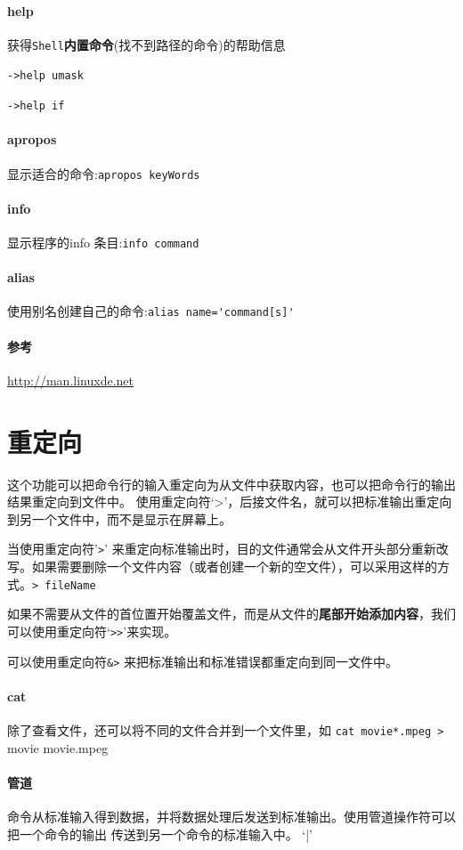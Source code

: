 \documentclass[UTF8,a4paper,12pt]{ctexbook}
\begin{document}
		\paragraph{help} 获得\verb|Shell|\textbf{内置命令}(找不到路径的命令)的帮助信息
		
			\verb|->help umask|
			
			\verb|->help if|
		
		\paragraph{apropos} 显示适合的命令:\verb|apropos keyWords|
		
		\paragraph{info} 显示程序的info 条目:\verb|info command|
		\paragraph{alias} 使用别名创建自己的命令:\verb|alias name='command[s]'|
		\paragraph{参考}\url{http://man.linuxde.net}
		
	\section{重定向}这个功能可以把命令行的输入重定向为从文件中获取内容，也可以把命令行的输出结果重定向到文件中。 使用重定向符‘>’，后接文件名，就可以把标准输出重定向到另一个文件中，而不是显示在屏幕上。
	
		当使用重定向符'\verb|>|' 来重定向标准输出时，目的文件通常会从文件开头部分重新改写。如果需要删除一个文件内容（或者创建一个新的空文件），可以采用这样的方式。\verb|> fileName|
		
		如果不需要从文件的首位置开始覆盖文件，而是从文件的\textbf{尾部开始添加内容}，我们可以使用重定向符‘\verb|>>|’来实现。
		
		可以使用重定向符\verb|&>| 来把标准输出和标准错误都重定向到同一文件中。
		
		\paragraph{cat}除了查看文件，还可以将不同的文件合并到一个文件里，如 \verb|cat movie*.mpeg >| movie movie.mpeg
		
		\paragraph{管道}命令从标准输入得到数据，并将数据处理后发送到标准输出。使用管道操作符可以把一个命令的输出 传送到另一个命令的标准输入中。 ‘|’	
\end{document}
